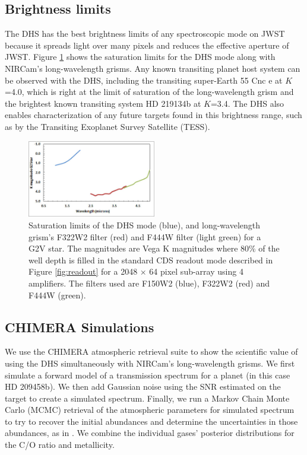 \documentclass[iop]{emulateapj}
\begin{document}
\subsection{Brightness limits}\label{sec:brightness}

The DHS has the best brightness limits of any spectroscopic mode on JWST because it spreads light over many pixels and reduces the effective aperture of JWST.
Figure \ref{fig:DHSaps} shows the saturation limits for the DHS mode along with NIRCam's long-wavelength grisms.
Any known transiting planet host system can be observed with the DHS, including the transiting super-Earth  55 Cnc e \citep{mcarthur2004disc55cnce} at $K$=4.0, which is right at the limit of saturation of the long-wavelength grism and the brightest known transiting system HD 219134b \citep{motalebi2015hd219134b} at $K$=3.4.
The DHS also enables characterization of any future targets found in this brightness range, such as by the Transiting Exoplanet Survey Satellite (TESS).

\begin{figure}[!ht]
\includegraphics[width=0.5\textwidth]{sat_limits.jpg}
\caption{Saturation limits of the DHS mode (blue), and long-wavelength grism's F322W2 filter (red) and F444W filter (light green) for a G2V star.
The magnitudes are Vega K magnitudes where 80\% of the well depth is filled in the standard CDS readout mode described in Figure \ref{fig:readout}  for a 2048 $\times$ 64 pixel sub-array using 4 amplifiers.
The filters used are F150W2 (blue), F322W2 (red) and F444W (green).}\label{fig:DHSaps}
\end{figure}

\subsection{CHIMERA Simulations}\label{sec:simulations}

We use the CHIMERA atmospheric retrieval suite \citep{line2013chimera,line2014CtOsecE} to show the scientific value of using the DHS simultaneously with NIRCam's long-wavelength grisms.
We first simulate a forward model of a transmission spectrum for a planet (in this case HD 209458b).
We then add Gaussian noise using the SNR estimated on the target to create a simulated spectrum.
Finally, we run a Markov Chain Monte Carlo (MCMC) retrieval of the atmospheric parameters for simulated spectrum to try to recover the initial abundances and determine the uncertainties in those abundances, as in \citet{greene2016jwst_trans}.
We combine the individual gases' posterior distributions for the C/O ratio and metallicity.
\end{document}
